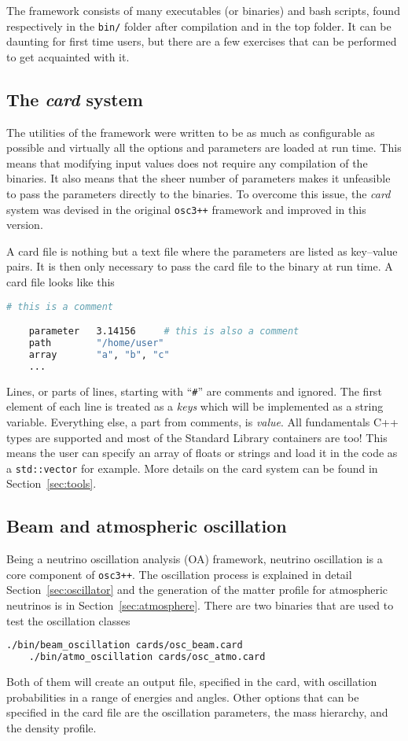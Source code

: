 \documentclass[a4paper, 11pt]{article}
\newcommand{\refsec}[1]{Section~\ref{#1}}
\begin{document}
The framework consists of many executables (or binaries) and bash scripts, %
found respectively in the \texttt{bin/} folder after compilation and in the top folder.
It can be daunting for first time users, but there are a few exercises that can be performed %
to get acquainted with it.

\subsection{The \emph{card} system}

The utilities of the framework were written to be as much as configurable as possible and %
virtually all the options and parameters are loaded at run time.
This means that modifying input values does not require any compilation of the binaries.
It also means that the sheer number of parameters makes it unfeasible to pass the parameters %
directly to the binaries.
To overcome this issue, the \emph{card} system was devised in the original \texttt{osc3++} %
framework and improved in this version.

A card file is nothing but a text file where the parameters are listed as key--value pairs.
It is then only necessary to pass the card file to the binary at run time.
A card file looks like this
\begin{lstlisting}[language=bash]
	# this is a comment

	parameter	3.14156		# this is also a comment
	path		"/home/user"
	array		"a", "b", "c"
	...
\end{lstlisting}
Lines, or parts of lines, starting with ``\texttt{\#}'' are comments and ignored.
The first element of each line is treated as a \emph{keys} which will be implemented %
as a string variable.
Everything else, a part from comments, is \emph{value}.
All fundamentals C++ types are supported and most of the Standard Library containers are too!
This means the user can specify an array of floats or strings and load it in the code as a \texttt{std::vector} for example.
More details on the card system can be found in \refsec{sec:tools}.

\subsection{Beam and atmospheric oscillation}

Being a neutrino oscillation analysis (OA) framework, neutrino oscillation is a core component of %
\texttt{osc3++}.
The oscillation process is explained in detail \refsec{sec:oscillator} %
and the generation of the matter profile for atmospheric neutrinos is in %
\refsec{sec:atmosphere}.
There are two binaries that are used to test the oscillation classes
\begin{lstlisting}[language=bash]
	./bin/beam_oscillation cards/osc_beam.card
	./bin/atmo_oscillation cards/osc_atmo.card
\end{lstlisting}
Both of them will create an output file, specified in the card, with oscillation %
probabilities in a range of energies and angles.
Other options that can be specified in the card file are the oscillation parameters, %
the mass hierarchy, and the density profile.
\end{document}
